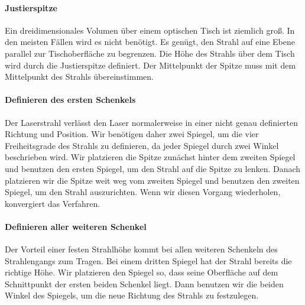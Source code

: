 \paragraph*{Justierspitze} Ein dreidimensionales Volumen über einem optischen Tisch ist ziemlich groß. In den meisten Fällen wird es nicht benötigt. Es genügt, den Strahl auf eine Ebene parallel zur Tischoberfläche zu begrenzen. Die Höhe des Strahls über dem Tisch wird durch die Justierspitze definiert. Der Mittelpunkt der Spitze muss mit dem Mittelpunkt des Strahls übereinstimmen.

\paragraph*{Definieren des ersten Schenkels} Der Laserstrahl verlässt den Laser normalerweise in einer nicht genau definierten Richtung und Position. Wir benötigen daher zwei Spiegel, um die vier Freiheitsgrade des Strahls zu definieren, da jeder Spiegel durch zwei Winkel beschrieben wird. Wir platzieren die Spitze zunächst hinter dem zweiten Spiegel und benutzen den ersten Spiegel, um den Strahl auf die Spitze zu lenken. Danach platzieren wir die Spitze weit weg vom zweiten Spiegel und benutzen den zweiten Spiegel, um den Strahl auszurichten. Wenn wir diesen Vorgang wiederholen, konvergiert das Verfahren.


\paragraph*{Definieren aller weiteren Schenkel} Der Vorteil einer festen Strahlhöhe kommt bei allen weiteren Schenkeln des Strahlengangs zum Tragen. Bei einem dritten Spiegel hat der Strahl bereits die richtige Höhe. Wir platzieren den Spiegel so, dass seine Oberfläche auf dem Schnittpunkt der ersten beiden Schenkel liegt. Dann benutzen wir die beiden Winkel des Spiegels, um die neue Richtung des Strahls zu festzulegen.








